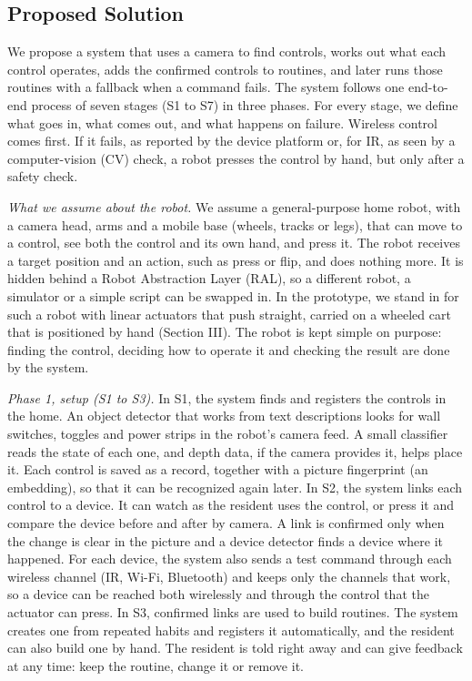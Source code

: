 \documentclass[conference]{IEEEtran}
\begin{document}
\subsection{Proposed Solution}\label{sec:solution}
We propose a system that uses a camera to find controls, works out what each control operates, adds the confirmed controls to routines, and later runs those routines with a fallback when a command fails. The system follows one end-to-end process of seven stages (S1 to S7) in three phases. For every stage, we define what goes in, what comes out, and what happens on failure. Wireless control comes first. If it fails, as reported by the device platform or, for IR, as seen by a computer-vision (CV) check, a robot presses the control by hand, but only after a safety check.

\textit{What we assume about the robot.} We assume a general-purpose home robot, with a camera head, arms and a mobile base (wheels, tracks or legs), that can move to a control, see both the control and its own hand, and press it. The robot receives a target position and an action, such as press or flip, and does nothing more. It is hidden behind a Robot Abstraction Layer (RAL), so a different robot, a simulator or a simple script can be swapped in. In the prototype, we stand in for such a robot with linear actuators that push straight, carried on a wheeled cart that is positioned by hand (Section III). The robot is kept simple on purpose: finding the control, deciding how to operate it and checking the result are done by the system.

\textit{Phase 1, setup (S1 to S3).} In S1, the system finds and registers the controls in the home. An object detector that works from text descriptions looks for wall switches, toggles and power strips in the robot's camera feed. A small classifier reads the state of each one, and depth data, if the camera provides it, helps place it. Each control is saved as a record, together with a picture fingerprint (an embedding), so that it can be recognized again later. In S2, the system links each control to a device. It can watch as the resident uses the control, or press it and compare the device before and after by camera. A link is confirmed only when the change is clear in the picture and a device detector finds a device where it happened. For each device, the system also sends a test command through each wireless channel (IR, Wi-Fi, Bluetooth) and keeps only the channels that work, so a device can be reached both wirelessly and through the control that the actuator can press. In S3, confirmed links are used to build routines. The system creates one from repeated habits and registers it automatically, and the resident can also build one by hand. The resident is told right away and can give feedback at any time: keep the routine, change it or remove it.
\end{document}
